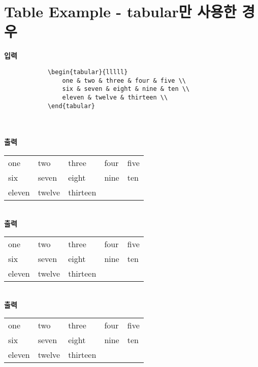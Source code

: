 \clearpage
\section{Table Example - tabular만 사용한 경우}

	\singlespacing
	\textbf{입력}\\
		\begin{boxedminipage}[t]{1.0\linewidth}
		\small
		\begin{verbatim}	
			\begin{tabular}{lllll}
				one & two & three & four & five \\
				six & seven & eight & nine & ten \\
				eleven & twelve & thirteen \\
			\end{tabular} 
		\end{verbatim} 
		\end{boxedminipage} \\ \\

		\textbf{출력}
		\begin{tabular}{lllll}
			\hline
			one & two & three & four & five \\
			six & seven & eight & nine & ten \\
			eleven & twelve & thirteen \\
			\hline
		\end{tabular} \\
		
		\textbf{출력} \\
		\begin{tabular}{lllll}
			\toprule
			one & two & three & four & five \\
			six & seven & eight & nine & ten \\
			eleven & twelve & thirteen \\
			\bottomrule
		\end{tabular} \\
		
	\doublespacing
		\textbf{출력} \\
		\begin{tabular}{lllll}
			\toprule
			one & two & three & four & five \\
			six & seven & eight & nine & ten \\
			eleven & twelve & thirteen \\
			\bottomrule
		\end{tabular} \\

